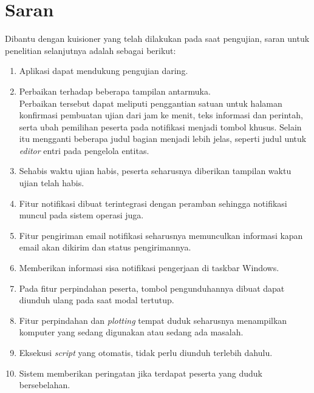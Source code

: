 \section{Saran}
    Dibantu dengan kuisioner yang telah dilakukan pada saat pengujian, saran untuk penelitian selanjutnya adalah
    sebagai berikut:
    \begin{enumerate}
        \item Aplikasi dapat mendukung pengujian daring.
        \item Perbaikan terhadap beberapa tampilan antarmuka. \\
            Perbaikan tersebut dapat meliputi penggantian satuan untuk halaman konfirmasi pembuatan ujian dari jam
            ke menit, teks informasi dan perintah, serta ubah pemilihan peserta pada notifikasi menjadi tombol khusus.
            Selain itu mengganti beberapa judul bagian menjadi lebih jelas, seperti judul untuk \textit{editor}
            entri pada pengelola entitas.
        \item Sehabis waktu ujian habis, peserta seharusnya diberikan tampilan waktu ujian telah habis.
        \item Fitur notifikasi dibuat terintegrasi dengan peramban sehingga notifikasi muncul pada 
            sistem operasi juga.
        \item Fitur pengiriman email notifikasi seharusnya memunculkan informasi kapan email akan
            dikirim dan status pengirimannya.
        \item Memberikan informasi sisa notifikasi pengerjaan di taskbar Windows.
        \item Pada fitur perpindahan peserta, tombol pengunduhannya dibuat dapat diunduh ulang pada
            saat modal tertutup.
        \item Fitur perpindahan dan \textit{plotting} tempat duduk seharusnya menampilkan komputer
            yang sedang digunakan atau sedang ada masalah.
        \item Eksekusi \textit{script} yang otomatis, tidak perlu diunduh terlebih dahulu.
        \item Sistem memberikan peringatan jika terdapat peserta yang duduk bersebelahan.
    \end{enumerate}